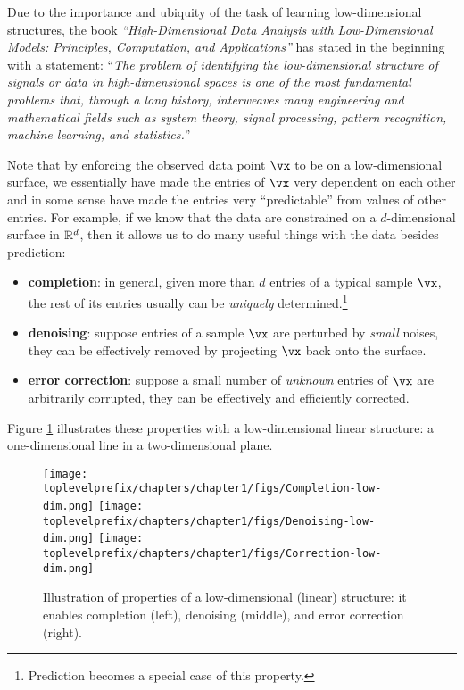 \documentclass[../../book-main.tex]{subfiles}
\begin{document}
Due to the importance and ubiquity of the task of  learning low-dimensional structures, the book {\em ``High-Dimensional Data Analysis with Low-Dimensional Models: Principles, Computation, and Applications''} \cite{Wright-Ma-2022} has stated in the beginning with a statement: ``{\em The problem of identifying the low-dimensional structure of signals or data in high-dimensional
spaces is one of the most fundamental problems that, through a long
history, interweaves many engineering and mathematical fields such as system
theory, signal processing, pattern recognition, machine learning, and statistics.}''

Note that by enforcing the observed data point $\vx$ to be on a low-dimensional surface, we essentially have made the entries of $\vx$ very dependent on each other and in some sense have made the entries very ``predictable'' from values of other entries. For example, if we know that the data are constrained on a $d$-dimensional surface in $\mathbb{R}^d$, then it allows us to do many useful things with the data besides prediction: %
\begin{itemize}
    \item \textbf{completion}: in general, given more than $d$ entries of a typical sample $\vx$, the rest of its entries usually can be {\em uniquely} determined.\footnote{Prediction becomes a special case of this property.} 
    \item \textbf{denoising}: suppose entries of a sample $\vx$ are perturbed by {\em small} noises, they can be effectively removed by projecting $\vx$ back onto the surface.
    \item \textbf{error correction}: suppose a small number of {\em unknown} entries of $\vx$ are arbitrarily corrupted, they can be effectively and efficiently corrected. 
\end{itemize}
Figure \ref{fig:low-dim-properties} illustrates these properties with a low-dimensional linear structure: a one-dimensional line in a two-dimensional plane. 

\begin{figure}
    \centering
    \texttt{[image: \\toplevelprefix/chapters/chapter1/figs/Completion-low-dim.png]}     \texttt{[image: \\toplevelprefix/chapters/chapter1/figs/Denoising-low-dim.png]} \texttt{[image: \\toplevelprefix/chapters/chapter1/figs/Correction-low-dim.png]} 
    \caption{Illustration of properties of a low-dimensional (linear) structure: it enables completion (left), denoising (middle), and error correction (right).}
    \label{fig:low-dim-properties}
\end{figure}
\end{document}
